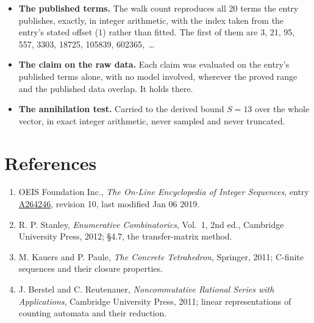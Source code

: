 \documentclass[11pt]{article}
\theoremstyle{definition}
\begin{document}
\begin{itemize}

\item {\bfseries The published terms.} The walk count reproduces all 20 terms the entry publishes, exactly, in integer arithmetic, with the index taken from the entry's stated offset (1) rather than fitted. The first of them are 3, 21, 95, 557, 3303, 18725, 105839, 602365,~\dots

\item {\bfseries The claim on the raw data.} Each claim was evaluated on the entry's published terms alone, with no model involved, wherever the proved range and the published data overlap. It holds there.

\item {\bfseries The annihilation test.} Carried to the derived bound $S = 13$ over the whole vector, in exact integer arithmetic, never sampled and never truncated.

\end{itemize}

\section{References}

\begin{enumerate}

\item OEIS Foundation Inc., \emph{The On-Line Encyclopedia of Integer Sequences}, entry \href{https://oeis.org/A264246}{A264246}, revision 10, last modified Jan 06 2019.

\item R. P. Stanley, \emph{Enumerative Combinatorics}, Vol.~1, 2nd ed., Cambridge University Press, 2012; \S4.7, the transfer-matrix method.

\item M. Kauers and P. Paule, \emph{The Concrete Tetrahedron}, Springer, 2011; C-finite sequences and their closure properties.

\item J. Berstel and C. Reutenauer, \emph{Noncommutative Rational Series with Applications}, Cambridge University Press, 2011; linear representations of counting automata and their reduction.

\end{enumerate}
\end{document}
